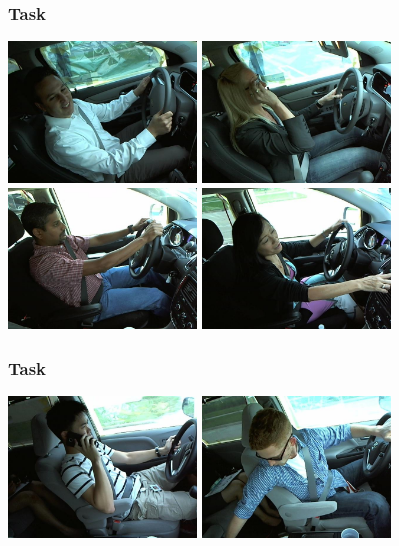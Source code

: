 \documentclass{beamer}
\begin{document}
	\begin{frame}
		\frametitle{Task}
		\begin{center}
			\includegraphics[width=5cm]{img_19} \vspace{0.1cm}
			\includegraphics[width=5cm]{img_26} \\
			\includegraphics[width=5cm]{img_34}\vspace{0.1cm}
			\includegraphics[width=5cm]{img_56}
		\end{center}
	\end{frame}
	
	\begin{frame}
		\frametitle{Task}
		\begin{center}
			\includegraphics[width=5cm]{img_94} \vspace{0.1cm}
			\includegraphics[width=5cm]{img_81} 
		\end{center}
	\end{frame}
	
\end{document}
